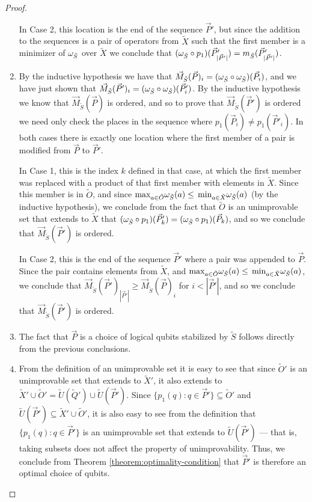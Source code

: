 \documentclass[twocolumn,showpacs,preprintnumbers,amsmath,amssymb,nofootinbib,pra,floatfix]{revtex4-1}
\newcommand{\lst}{\vec}
\newcommand{\set}{\tilde}
\begin{document}
\begin{proof}
\begin{enumerate}
In Case 2, this location is the end of the sequence $\lst P'$, but since the addition to the sequences is a pair of operators from $\set X$ such that the first member is a minimizer of $\om_{\set S}$ over $\set X$ we conclude that $(\om_{\set S}\circ p_1)(\lst P'_{|\lst P'|})=m_{\set S}(\lst P'_{|\lst P'|})$.
\item

By the inductive hypothesis we have that $\lst M_{\set S}(\lst P)_i=(\om_{\set S}\circ \om_{\set S})(\lst P_i)$, and we have just shown that $\lst M_{\set S}(\lst P')_i=(\om_{\set S}\circ \om_{\set S})(\lst P'_i)$.  By the inductive hypothesis we know that $\lst M_{\set S}(\lst P)$ is ordered, and so to prove that $\lst M_{\set S}(\lst P')$ is ordered we need only check the places in the sequence where $p_1(\lst P_i)\ne p_1(\lst P'_i)$.  In both cases there is exactly one location where the first member of a pair is modified from $\lst P$ to $\lst P'$.

In Case 1, this is the index $k$ defined in that case, at which the first member was replaced with a product of that first member with elements in $\set X$.  Since this member is in $\set O$, and since $\max_{a\in\set O}\om_{\set S}(a)\le\min_{a\in\set X}\om_{\set S}(a)$ (by the inductive hypothesis), we conclude from the fact that $\set O$ is an unimprovable set that extends to $\set X$ that $(\om_{\set S}\circ p_1)(\lst P'_k)=(\om_{\set S}\circ p_1)(\lst P_k)$, and so we conclude that $\lst M_{\set S}(\lst P')$ is ordered.

In Case 2, this is the end of the sequence $\lst P'$ where a pair was appended to $\lst P$.  Since the pair contains elements from $\set X$, and $\max_{a\in\set O}\om_{\set S}(a)\le\min_{a\in\set X}\om_{\set S}(a)$, we conclude that $\lst M_{\set S}(\lst P')_{|\lst P'|}\ge\lst M_{\set S}(\lst P)_i$ for $i<|\lst P'|$, and so we conclude that $\lst M_{\set S}(\lst P')$ is ordered.
\item

The fact that $\lst P$ is a choice of logical qubits stabilized by $\set S$ follows directly from the previous conclusions.
\item

From the definition of an unimprovable set it is easy to see that since $\set O'$ is an unimprovable set that extends to $\set X'$, it also extends to $\set X'\cup\set O'=\set U(\set Q')\cup\set U(\lst P')$.  Since $\{p_1(q):q\in\lst P'\}\subseteq \set O'$ and $\set U(\lst P')\subseteq \set X'\cup\set O'$, it is also easy to see from the definition that $\{p_1(q):q\in\lst P'\}$ is an unimprovable set that extends to $\set U(\lst P')$ --- that is, taking subsets does not affect the property of unimprovability.  Thus, we conclude from Theorem \ref{theorem:optimality-condition} that $\lst P'$ is therefore an optimal choice of qubits.
\end{enumerate}
\end{proof}
\end{document}
